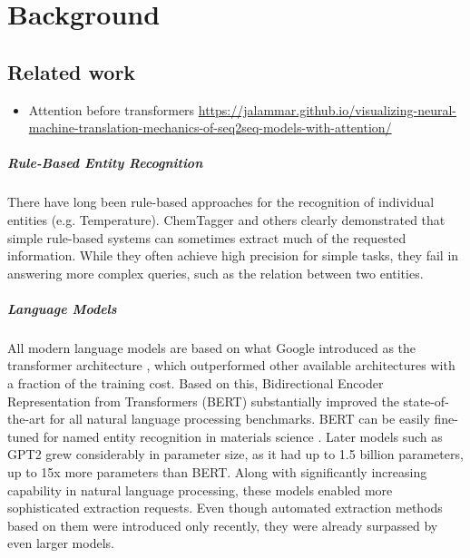\chapter{Background}

\section{Related work}

\begin{itemize}
    \item Attention before transformers \url{https://jalammar.github.io/visualizing-neural-machine-translation-mechanics-of-seq2seq-models-with-attention/}
\end{itemize}

\paragraph{Rule-Based Entity Recognition}
There have long been rule-based approaches for the recognition of individual
entities (e.g. Temperature). ChemTagger \cite{hawizy_chemicaltagger_2011}
and others \cite{beard_comparative_2019, huang_database_2020}
clearly demonstrated that simple rule-based systems can sometimes extract much
of the requested information. While they often achieve high precision for
simple tasks, they fail in answering more complex queries, such as the relation
between two entities.

\paragraph{Language Models}
All modern language models are based on what Google introduced as the
transformer architecture \cite{vaswani_attention_2017}, which outperformed
other available architectures with a fraction of the training cost. Based on
this, Bidirectional Encoder Representation from Transformers (BERT)
\cite{devlin_bert_2018} substantially improved the state-of-the-art for all
natural language processing benchmarks. BERT can be easily fine-tuned for named
entity recognition in materials science \cite{zhao_finetuning_2021b}. Later
models such as GPT2 \cite{radford_language_2019} grew considerably in parameter
size, as it had up to 1.5 billion parameters, up to 15x more parameters than
BERT. Along with significantly increasing capability in natural language
processing, these models enabled more sophisticated extraction requests.
Even though automated extraction methods based on them were introduced only
recently, they were already surpassed by even larger models.

